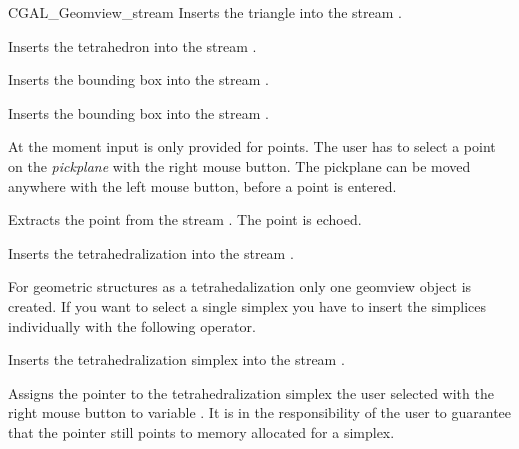 \begin{ccClass}{CGAL_Geomview_stream}
{Inserts the triangle  into the stream \ccVar.}


{Inserts the tetrahedron  into the stream \ccVar.}


{Inserts the bounding box  into the stream \ccVar.}

{Inserts the bounding box  into the stream \ccVar.}



At the moment input is only provided for points. The user has to select
a point on the {\it pickplane} with the right mouse button. The pickplane
can be moved anywhere with the left mouse button, before a point is entered.

{Extracts the point  from the stream \ccVar. The point is
 echoed.}




{Inserts the tetrahedralization  into the stream \ccVar.}

For geometric structures as a tetrahedalization only one geomview
object is created. If you want to select a single simplex you have
to insert the simplices individually with the following operator.

{Inserts the tetrahedralization simplex  into the stream \ccVar.}


{Assigns the pointer to the tetrahedralization simplex the user selected
 with the right mouse button to variable . 
\ccPrecond It is in the responsibility of the user to guarantee that the
pointer still points to memory allocated for a simplex.}



\end{ccClass}
